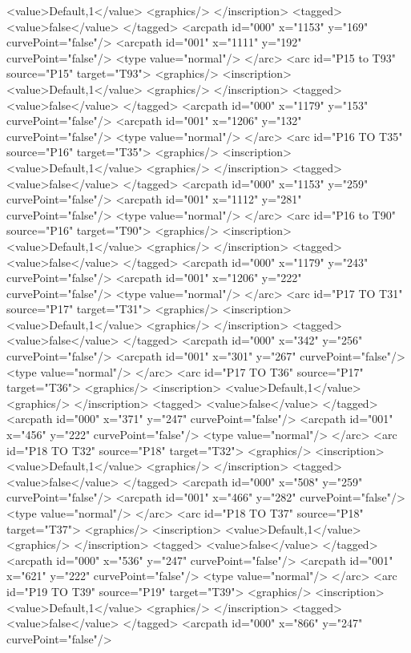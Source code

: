 <value>Default,1</value>
<graphics/>
</inscription>
<tagged>
<value>false</value>
</tagged>
<arcpath id="000" x="1153" y="169" curvePoint="false"/>
<arcpath id="001" x="1111" y="192" curvePoint="false"/>
<type value="normal"/>
</arc>
<arc id="P15 to T93" source="P15" target="T93">
<graphics/>
<inscription>
<value>Default,1</value>
<graphics/>
</inscription>
<tagged>
<value>false</value>
</tagged>
<arcpath id="000" x="1179" y="153" curvePoint="false"/>
<arcpath id="001" x="1206" y="132" curvePoint="false"/>
<type value="normal"/>
</arc>
<arc id="P16 TO T35" source="P16" target="T35">
<graphics/>
<inscription>
<value>Default,1</value>
<graphics/>
</inscription>
<tagged>
<value>false</value>
</tagged>
<arcpath id="000" x="1153" y="259" curvePoint="false"/>
<arcpath id="001" x="1112" y="281" curvePoint="false"/>
<type value="normal"/>
</arc>
<arc id="P16 to T90" source="P16" target="T90">
<graphics/>
<inscription>
<value>Default,1</value>
<graphics/>
</inscription>
<tagged>
<value>false</value>
</tagged>
<arcpath id="000" x="1179" y="243" curvePoint="false"/>
<arcpath id="001" x="1206" y="222" curvePoint="false"/>
<type value="normal"/>
</arc>
<arc id="P17 TO T31" source="P17" target="T31">
<graphics/>
<inscription>
<value>Default,1</value>
<graphics/>
</inscription>
<tagged>
<value>false</value>
</tagged>
<arcpath id="000" x="342" y="256" curvePoint="false"/>
<arcpath id="001" x="301" y="267" curvePoint="false"/>
<type value="normal"/>
</arc>
<arc id="P17 TO T36" source="P17" target="T36">
<graphics/>
<inscription>
<value>Default,1</value>
<graphics/>
</inscription>
<tagged>
<value>false</value>
</tagged>
<arcpath id="000" x="371" y="247" curvePoint="false"/>
<arcpath id="001" x="456" y="222" curvePoint="false"/>
<type value="normal"/>
</arc>
<arc id="P18 TO T32" source="P18" target="T32">
<graphics/>
<inscription>
<value>Default,1</value>
<graphics/>
</inscription>
<tagged>
<value>false</value>
</tagged>
<arcpath id="000" x="508" y="259" curvePoint="false"/>
<arcpath id="001" x="466" y="282" curvePoint="false"/>
<type value="normal"/>
</arc>
<arc id="P18 TO T37" source="P18" target="T37">
<graphics/>
<inscription>
<value>Default,1</value>
<graphics/>
</inscription>
<tagged>
<value>false</value>
</tagged>
<arcpath id="000" x="536" y="247" curvePoint="false"/>
<arcpath id="001" x="621" y="222" curvePoint="false"/>
<type value="normal"/>
</arc>
<arc id="P19 TO T39" source="P19" target="T39">
<graphics/>
<inscription>
<value>Default,1</value>
<graphics/>
</inscription>
<tagged>
<value>false</value>
</tagged>
<arcpath id="000" x="866" y="247" curvePoint="false"/>
